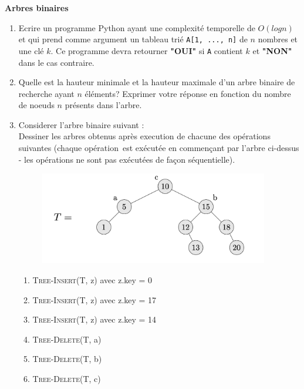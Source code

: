 \begin{Exercice}[20 minutes]\textbf{Arbres binaires}\\
	\begin{enumerate}
		\item Ecrire un programme Python ayant une complexité temporelle de $O(log n)$ et qui prend comme argument un tableau trié \lstinline{A[1, ..., n]} de $n$ nombres et une clé $k$. Ce programme devra retourner \textbf{"OUI"} si \lstinline{A} contient $k$ et \textbf{"NON"} dans le cas contraire.
		\item Quelle est la hauteur minimale et la hauteur maximale d'un arbre binaire de recherche ayant $n$ éléments? Exprimer votre réponse en fonction du nombre de noeuds $n$ présents dans l'arbre.
		\item Considerer l'arbre binaire suivant : \\
		
		Dessiner les arbres obtenus après execution de chacune des opérations suivantes (chaque opération~est exécutée en commençant par l'arbre ci-dessus - les opérations ne sont pas exécutées de façon séquentielle).
		
		\begin{figure}[h!]
        			\centering
       	 		\includegraphics[width=10cm]{resources/exoArbreBinEnonce.png}
	    	\end{figure}
		\begin{enumerate}
			\item \textsc{Tree-Insert}(T, z) avec z.key = 0
			\item \textsc{Tree-Insert}(T, z) avec z.key = 17
			\item \textsc{Tree-Insert}(T, z) avec z.key = 14
			\item \textsc{Tree-Delete}(T, a)
			\item \textsc{Tree-Delete}(T, b)
			\item \textsc{Tree-Delete}(T, c)
		\end{enumerate}



\end{enumerate}
\end{Exercice}
